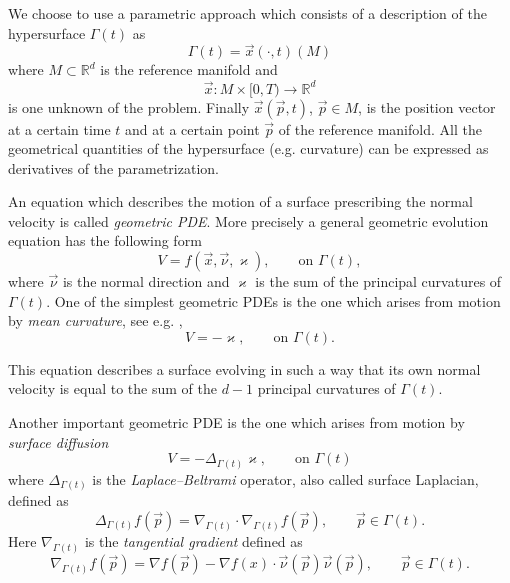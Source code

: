 \documentclass[a4paper,11pt, onecolumn]{article}
\newcommand{\cor}[1]{\textit{#1}} %
\begin{document}
\noindent We choose to use a parametric approach which consists of a description of the hypersurface $\Gamma(t)$ as
\begin{equation}\label{eq:parametric_hypersurface}
 \Gamma(t)=\vec{x}(\cdot,t)(M)
\end{equation}
where $M\subset\mathbb{R}^{d}$ is the reference manifold and
\begin{equation}\label{eq:position_vector}
 \vec{x}:M\times[0,T)\rightarrow\mathbb{R}^{d}
\end{equation}
is one unknown of the problem. Finally $\vec{x}(\vec{p},t)$, $\vec{p}\in M$, is the position vector at a certain time $t$ and at a certain point $\vec{p}$ of the reference manifold. All the geometrical quantities of the hypersurface (e.g. curvature) can be expressed as derivatives of the parametrization.
\newline

\noindent An equation which describes the motion of a surface prescribing the normal velocity is called \cor{geometric PDE}. More precisely a general geometric evolution equation has the following form
\begin{equation}\label{eq:geometric_pde}
 V=f(\vec{x},\vec{\nu},\varkappa),\qquad\mbox{on }\Gamma(t),
\end{equation}
where $\vec{\nu}$ is the normal direction and $\varkappa$ is the sum of the principal curvatures of $\Gamma(t)$. One of the simplest geometric PDEs is the one which arises from motion by \cor{mean curvature}, see e.g. \cite{DeckelnickDE05},
\begin{equation}\label{eq:mean_curvature}
 V=-\varkappa,\qquad\mbox{on }\Gamma(t).
\end{equation}

\noindent This equation describes a surface evolving in such a way that its own normal velocity is equal to the sum of the $d-1$ principal curvatures of $\Gamma(t)$.
\newline

\noindent Another important geometric PDE is the one which arises from motion by \cor{surface diffusion}
\begin{equation}\label{eq:surface_diff}
 V=-\Delta_{\Gamma(t)} \varkappa,\qquad\mbox{on }\Gamma(t)
\end{equation}
where $\Delta_{\Gamma(t)}$ is the \cor{Laplace--Beltrami} operator, also called surface Laplacian, defined as
\begin{equation}\label{eq:laplace_beltrami}
 \Delta_{\Gamma(t)}f(\vec{p})=\nabla_{\Gamma(t)}\cdot\nabla_{\Gamma(t)}f(\vec{p}),\qquad \vec{p}\in\Gamma(t). 
\end{equation}
Here $\nabla_{\Gamma(t)}$ is the \cor{tangential gradient} defined as
\begin{equation}\label{eq:tangent_gradient}
 \nabla_{\Gamma(t)}f(\vec{p})=\nabla f(\vec{p})-\nabla f(x)\cdot\vec{\nu}(\vec{p})\vec{\nu}(\vec{p}),\qquad \vec{p}\in\Gamma(t).
\end{equation}
\end{document}
